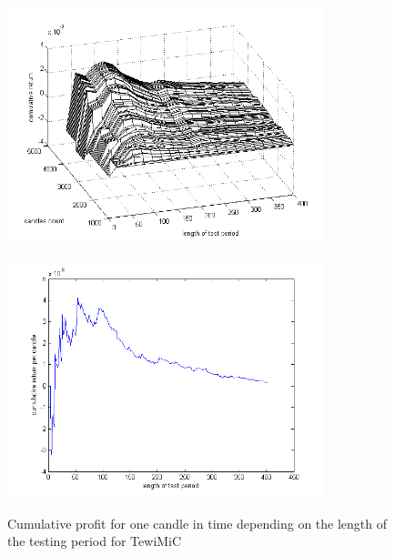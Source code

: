 \documentclass{tewiart}
\begin{document}
\begin{figure}[h!]
\centering
\begin{minipage}{.49\linewidth}
\begin{center}
\includegraphics[width=0.82\textwidth]{pictures/cumulativeReturnsPerCandleC.png}
\label{Cum3DPerCMiC}
\end{center}
\end{minipage}
\begin{minipage}{.49\linewidth}
\begin{center}
\includegraphics[width=0.82\textwidth]{pictures/mic_percandle_end.png}
\label{Cum3DPerCMiCend}
\end{center}
\end{minipage}
\caption{Cumulative profit for one candle in time depending on the length of the testing period for TewiMiC}
\end{figure}
\FloatBarrier
\end{document}
